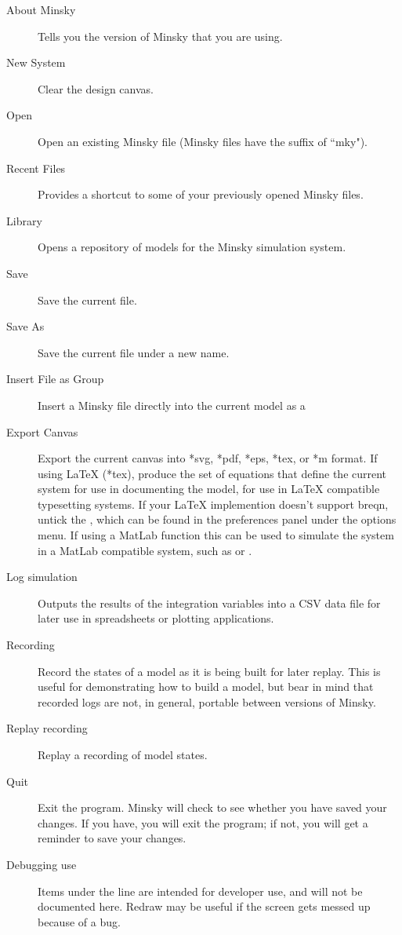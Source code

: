 \begin{description}
\item[About Minsky] Tells you the version of Minsky that you are using.

\item[New System] Clear the design canvas.

\item[Open] Open an existing Minsky file (Minsky files have the suffix of ``mky").

\item[Recent Files]\label{recentfiles} Provides a shortcut to some of
your previously opened Minsky files.

\item[Library] Opens a repository of models for the Minsky simulation system.

\item[Save] Save the current file.

\item[Save As] Save the current file under a new name.

\item[Insert File as Group] Insert a Minsky file directly into the
current model as a 

\item[Export Canvas] Export the current canvas into *svg, *pdf, *eps, *tex, or *m format.
  If using LaTeX (*tex), produce the set of equations that define the
  current system for use in documenting the model, for use in LaTeX
  compatible typesetting systems. If your LaTeX implemention doesn't
  support breqn, untick the , which can be found in the preferences panel under the options menu.
  If using a MatLab function this can be used to simulate the system in a MatLab compatible system,
  such as  or 
  .

\item[Log simulation] Outputs the results of the integration variables
into a CSV data file for later use in spreadsheets or plotting
applications.

\item[Recording] Record the states of a model as it is being built for later
replay. This is useful for demonstrating how to build a model, but
bear in mind that recorded logs are not, in general, portable between
versions of Minsky.

\item[Replay recording] Replay a recording of model states.

\item[Quit] Exit the program. Minsky will check to see whether you have saved your changes. If you have, you will exit the program; if not, you will get a reminder to save your changes.

\item[Debugging use] Items under the line are intended for developer
  use, and will not be documented here. Redraw may be useful if the
  screen gets messed up because of a bug.

\end{description}

